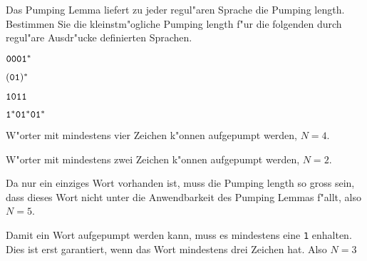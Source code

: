 Das Pumping Lemma liefert zu jeder regul"aren Sprache die Pumping length.
Bestimmen Sie die kleinstm"ogliche Pumping length f"ur die folgenden
durch regul"are Ausdr"ucke definierten Sprachen.
\begin{teilaufgaben}
\item ${\tt 0001}^*$
\item $({\tt 01})^*$
\item ${\tt 1011}$
\item ${\tt 1}^*{\tt 01}^*{\tt 01}^*$
\end{teilaufgaben}

\begin{loesung}
\begin{teilaufgaben}
\item W"orter mit mindestens vier Zeichen k"onnen aufgepumpt werden,
$N=4$.
\item W"orter mit mindestens zwei Zeichen k"onnen aufgepumpt werden,
$N=2$.
\item Da nur ein einziges Wort vorhanden ist, muss die Pumping length
so gross sein, dass dieses Wort nicht unter die Anwendbarkeit des
Pumping Lemmas f"allt, also $N=5$.
\item Damit ein Wort aufgepumpt werden kann, muss es mindestens eine
{\tt 1} enhalten. Dies ist erst garantiert, wenn das Wort  mindestens
drei Zeichen hat. Also $N=3$
\qedhere
\end{teilaufgaben}
\end{loesung}
